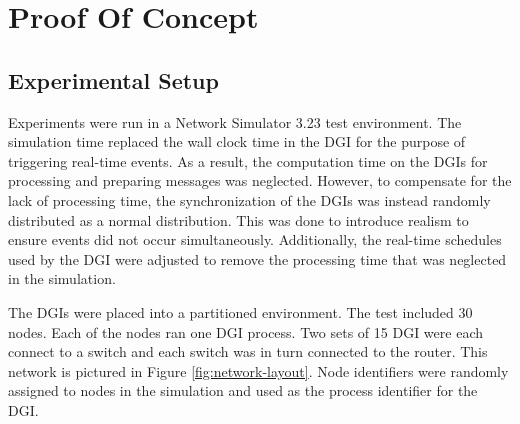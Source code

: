 

\section{Proof Of Concept}

\subsection{Experimental Setup}
\label{sect:experimentalsetup}

Experiments were run in a Network Simulator 3.23\cite{NS3} test environment.
The simulation time replaced the wall clock time in the \ac{DGI} for the purpose of triggering real-time events.
As a result, the computation time on the \ac{DGI}s for processing and preparing messages was neglected.
However, to compensate for the lack of processing time, the synchronization of the \ac{DGI}s was instead randomly distributed as a normal distribution.
This was done to introduce realism to ensure events did not occur simultaneously.
Additionally, the real-time schedules used by the \ac{DGI} were adjusted to remove the processing time that was neglected in the simulation.

The \ac{DGI}s were placed into a partitioned environment.
The test included 30 nodes.
Each of the nodes ran one \ac{DGI} process.
Two sets of 15 \ac{DGI} were each connect to a switch and each switch was in turn connected to the router.
This network is pictured in Figure \ref{fig:network-layout}.
Node identifiers were randomly assigned to nodes in the simulation and used as the process identifier for the \ac{DGI}.

